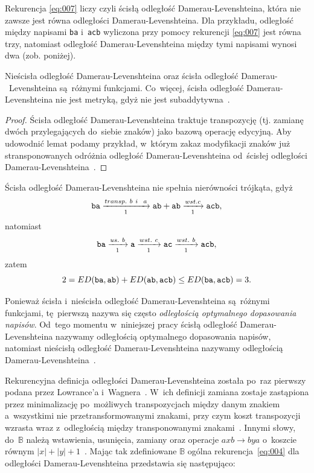 \documentclass{praca1}
\begin{document}
Rekurencja \eqref{eq:007} liczy czyli ścisłą odległość Damerau-Levenshteina, która nie zawsze jest równa odległości Damerau-Levenshteina. Dla przykładu, odległość między napisami \verb|ba| i~\verb|acb| wyliczona przy pomocy rekurencji \eqref{eq:007} jest równa trzy, natomiast odległość Damerau-Levenshteina między tymi napisami wynosi dwa (zob. poniżej).

\begin{lemma}
Nieścisła odległość Damerau-Levenshteina oraz ścisła odległość Damerau-~Levenshteina są~różnymi funkcjami. Co~więcej, ścisła odległość Damerau-Levenshteina nie jest metryką, gdyż nie jest subaddytywna~\cite{Boytsov2011:indexingmethods}.
\end{lemma}

\begin{proof}
Ścisła odległość Damerau-Levenshteina traktuje transpozycję (tj. zamianę dwóch przylegających do~siebie znaków) jako bazową operację edycyjną. Aby udowodnić lemat podamy przykład, w~którym zakaz modyfikacji znaków już stransponowanych odróżnia odległość Damerau-Levenshteina od~ścisłej odległości Damerau-Levenshteina~\cite{Boytsov2011:indexingmethods}.
\end{proof}

Ścisła odległość Damerau-Levenshteina nie spełnia nierówności trójkąta, gdyż
$$
\verb|ba|  \xrightarrow[1]{transp.\ b\ i~\ a} \verb|ab| + \verb|ab| \xrightarrow[1]{wst. c} \verb|acb|,
$$
natomiast
$$
\verb|ba|  \xrightarrow[1]{us.\ b} \verb|a| \xrightarrow[1]{wst.\ c} \verb|ac| \xrightarrow[1]{wst.\ b} \verb|acb|,
$$
zatem
$$
2 = ED(\verb|ba|, \verb|ab|) + ED(\verb|ab|, \verb|acb|) \leq ED(\verb|ba|, \verb|acb|) = 3.
$$

Ponieważ ścisła i~nieścisła odległość Damerau-Levenshteina są~różnymi funkcjami, tę~pierwszą nazywa się często \emph{odległością optymalnego dopasowania napisów}. Od~tego momentu w~niniejszej pracy ścisłą odległość Damerau-Levenshteina nazywamy odległością optymalnego dopasowania napisów, natomiast nieścisłą odległość Damerau-Levenshteina nazywamy odległością Damerau-Levenshteina~\cite{Loo2014:stringdist}.

Rekurencyjna definicja odległości Damerau-Levenshteina została po~raz pierwszy podana przez Lowrance'a i~Wagnera~\cite{Wagner1975:extensionstring}. W~ich definicji zamiana zostaje zastąpiona przez minimalizację po~możliwych transpozycjach między danym znakiem a~wszystkimi nie przetransformowanymi znakami, przy czym koszt transpozycji wzrasta wraz z~odległością między transponowanymi znakami~\cite{Loo2014:stringdist}. Innymi słowy, do~$\mathbb{B}$ należą wstawienia, usunięcia, zamiany oraz operacje $axb \rightarrow bya$ o~koszcie równym $|x| + |y| + 1$~\cite{Boytsov2011:indexingmethods}. Mając tak zdefiniowane $\mathbb{B}$ ogólna rekurencja~\eqref{eq:004} dla odległości Damerau-Levenshteina przedstawia się następująco: 
\end{document}
